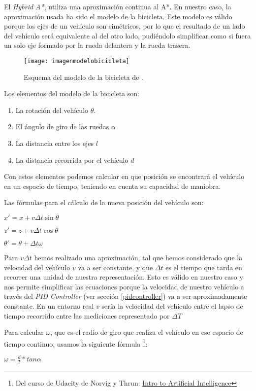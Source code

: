 El \textit{Hybrid A*}, utiliza una aproximación continua al A*. En nuestro caso, la aproximación usada ha sido el modelo de la bicicleta. Este modelo es válido porque los ejes de un vehículo son simétricos, por lo que el resultado de un lado del vehículo será equivalente al del otro lado, pudiéndolo simplificar como si fuera un solo eje formado por la rueda delantera y la rueda trasera.
\begin{figure}[htpb]
    \centering
    \texttt{[image: imagenmodelobicicleta]}
    \caption[Esquema del modelo de la bicicleta]{Esquema del modelo de la bicicleta de \cite{articuloimagenmodelobicicleta}.}
    \label{fig:basics AFM sketch}
\end{figure}

Los elementos del modelo de la bicicleta son:
\begin{enumerate}
\item La rotación del vehículo $\theta$.
\item El ángulo de giro de las ruedas $\alpha$
\item La distancia entre los ejes $l$
\item La distancia recorrida por el vehículo $d$
\end{enumerate}

Con estos elementos podemos calcular en que posición se encontrará el vehículo en un espacio de tiempo, teniendo en cuenta su capacidad de maniobra.

\label{formulashybrid}Las fórmulas para el cálculo de la nueva posición del vehículo son:
\begin{center}
$x' = x +  v \Delta t \sin \theta$

$z' = z +  v \Delta t \cos \theta$

$\theta' = \theta + \Delta t \omega $
\end{center}

Para $v \Delta t$ hemos realizado una aproximación, tal que hemos considerado que la velocidad del vehículo $v$ va a ser constante, y que $\Delta t$ es el tiempo que tarda en recorrer una unidad de nuestra representación. Esto es válido en nuestro caso y nos permite simplificar las ecuaciones porque la velocidad de nuestro vehículo a través del \textit{PID Controller} (ver sección \ref{pidcontroller}) va a ser aproximadamente constante. En un entorno real $v$ sería la velocidad del vehículo entre el lapso de tiempo recorrido entre las mediciones representado por $\Delta T$ 

Para calcular $\omega$, que es el radio de giro que realiza el vehículo en ese espacio de tiempo continuo, usamos la siguiente fórmula
\footnote{Del curso de Udacity de Norvig y Thrun: \href{https://www.udacity.com/course/intro-to-artificial-intelligence--cs271}{Intro to Artificial Intelligence}}:
\begin{center}
$\omega = \displaystyle \frac{d}{l} * tan \alpha  $
\end{center}

